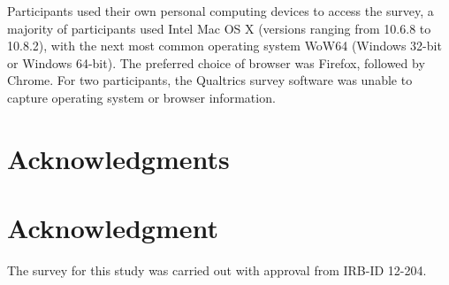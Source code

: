 Participants used their own personal computing devices to access the survey, 
a majority of participants used Intel Mac OS X (versions ranging from 10.6.8 to 10.8.2), with the next most common operating system WoW64 (Windows 32-bit or Windows 64-bit). The preferred choice of browser was  Firefox, followed by Chrome. For two participants, the Qualtrics survey software was unable to capture operating system or browser information.

                           

\ifCLASSOPTIONcompsoc
  \section*{Acknowledgments}
\else
  \section*{Acknowledgment}
\fi


The survey for this study was carried out with approval from  IRB-ID 12-204.


\ifCLASSOPTIONcaptionsoff
  \newpage
\fi





